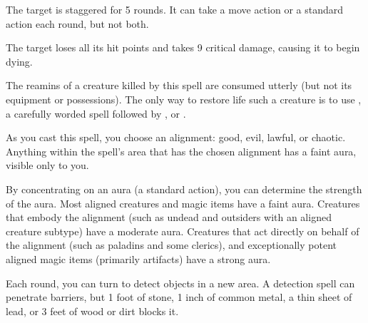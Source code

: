 \spellrng{\rngclose}
\begin{spellhealthy}
  The target is staggered for 5 rounds. It can take a move action or a standard action each round, but not both.
\end{spellhealthy}
\begin{spellblood}
  The target loses all its hit points and takes 9 critical damage, causing it to begin dying.
\end{spellblood}
\begin{spellnotes}
  The reamins of a creature killed by this spell are consumed utterly (but not its equipment or possessions). The only way to restore life such a creature is to use , a carefully worded  spell followed by , or .
\end{spellnotes}

\begin{spelleffect}
    As you cast this spell, you choose an alignment: good, evil, lawful, or chaotic. Anything within the spell's area that has the chosen alignment has a faint aura, visible only to you.
    
    By concentrating on an aura (a standard action), you can determine the strength of the aura. Most aligned creatures and magic items have a faint aura. Creatures that embody the alignment (such as undead and outsiders with an aligned creature subtype) have a moderate aura. Creatures that act directly on behalf of the alignment (such as paladins and some clerics), and exceptionally potent aligned magic items (primarily artifacts) have a strong aura.
\end{spelleffect}
\begin{spellnotes}
  Each round, you can turn to detect objects in a new area. A detection spell can penetrate barriers, but 1 foot of stone, 1 inch of common metal, a thin sheet of lead, or 3 feet of wood or dirt blocks it.
\end{spellnotes}

